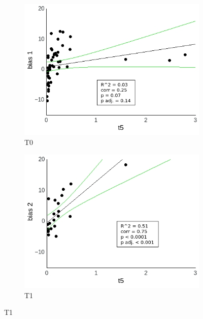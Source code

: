 \documentclass[a4paper]{scrreprt}
\begin{document}
\begin{figure}
\centering
\begin{subfigure}[b]{0.49\textwidth}
        \includegraphics[width=\textwidth]{figs/sec3/t5/t5_diff_1_mod1dat.jpeg}
        \caption{T0}
    \end{subfigure}
    \begin{subfigure}[b]{0.49\textwidth}
        \includegraphics[width=\textwidth]{figs/sec3/t5/t5_diff_2_mod1dat.jpeg}
        \caption{T1}
    \end{subfigure}


\end{figure}
\end{document}
